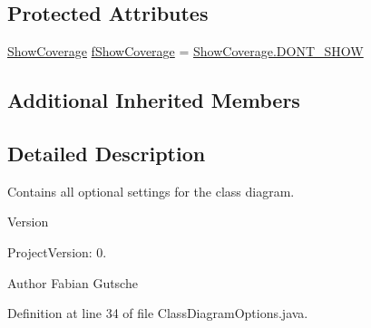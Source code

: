 \subsection*{Protected Attributes}
\begin{DoxyCompactItemize}
\item 
\hyperlink{enumorg_1_1tzi_1_1use_1_1gui_1_1views_1_1diagrams_1_1classdiagram_1_1_class_diagram_options_1_1_show_coverage}{Show\-Coverage} \hyperlink{classorg_1_1tzi_1_1use_1_1gui_1_1views_1_1diagrams_1_1classdiagram_1_1_class_diagram_options_a4a728d0cdf8f4575edbf711dd9028fb3}{f\-Show\-Coverage} = \hyperlink{enumorg_1_1tzi_1_1use_1_1gui_1_1views_1_1diagrams_1_1classdiagram_1_1_class_diagram_options_1_1_show_coverage_a0a525dcac0a887161a1838c6f96c5b16}{Show\-Coverage.\-D\-O\-N\-T\-\_\-\-S\-H\-O\-W}
\end{DoxyCompactItemize}
\subsection*{Additional Inherited Members}


\subsection{Detailed Description}
Contains all optional settings for the class diagram.

\begin{DoxyVersion}{Version}

\end{DoxyVersion}
\begin{DoxyParagraph}{Project\-Version\-:}
0. 
\end{DoxyParagraph}
\begin{DoxyAuthor}{Author}
Fabian Gutsche 
\end{DoxyAuthor}


Definition at line 34 of file Class\-Diagram\-Options.\-java.



